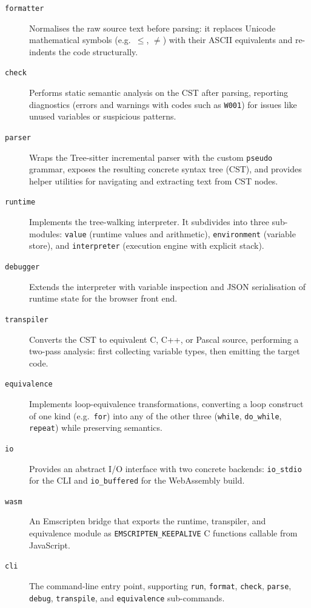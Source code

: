 \begin{description}
  \item[\texttt{formatter}] Normalises the raw source text before parsing: it
        replaces Unicode mathematical symbols (e.g.\ $\leq$, $\neq$) with
        their ASCII equivalents and re-indents the code structurally.

  \item[\texttt{check}] Performs static semantic analysis on the CST after
        parsing, reporting diagnostics (errors and warnings with codes such as
        \texttt{W001}) for issues like unused variables or suspicious patterns.

  \item[\texttt{parser}] Wraps the Tree-sitter incremental parser with the
        custom \texttt{pseudo} grammar, exposes the resulting concrete syntax
        tree (CST), and provides helper utilities for navigating and extracting
        text from CST nodes.

  \item[\texttt{runtime}] Implements the tree-walking interpreter.  It
        subdivides into three sub-modules: \texttt{value} (runtime values and
        arithmetic), \texttt{environment} (variable store), and
        \texttt{interpreter} (execution engine with explicit stack).

  \item[\texttt{debugger}] Extends the interpreter with variable inspection
        and JSON serialisation of runtime state for the browser front end.

  \item[\texttt{transpiler}] Converts the CST to equivalent C, C++, or Pascal
        source, performing a two-pass analysis: first collecting variable types,
        then emitting the target code.

  \item[\texttt{equivalence}] Implements loop-equivalence transformations,
        converting a loop construct of one kind (e.g.\ \texttt{for}) into any
        of the other three (\texttt{while}, \texttt{do\_while}, \texttt{repeat})
        while preserving semantics.

  \item[\texttt{io}] Provides an abstract I/O interface with two concrete
        backends: \texttt{io\_stdio} for the CLI and \texttt{io\_buffered} for
        the WebAssembly build.

  \item[\texttt{wasm}] An Emscripten bridge that exports the runtime,
        transpiler, and equivalence module as \texttt{EMSCRIPTEN\_KEEPALIVE}
        C functions callable from JavaScript.

  \item[\texttt{cli}] The command-line entry point, supporting \texttt{run},
        \texttt{format}, \texttt{check}, \texttt{parse}, \texttt{debug},
        \texttt{transpile}, and \texttt{equivalence} sub-commands.
\end{description}

